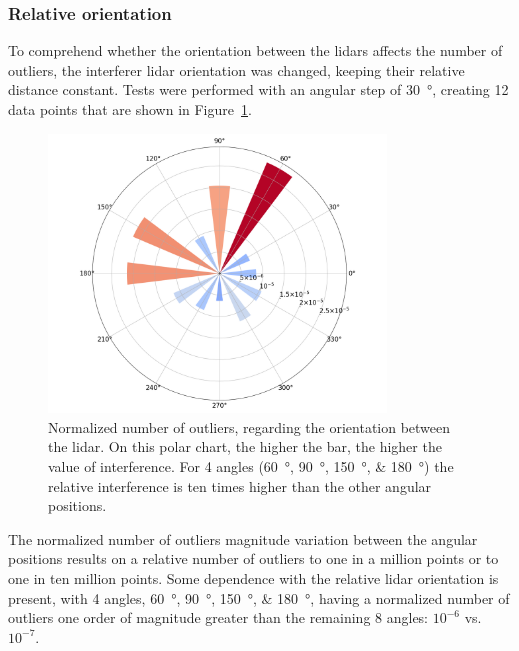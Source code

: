 \subsubsection{Relative orientation}
To comprehend whether the orientation between the \acp{lidar} affects the number of outliers, the interferer \ac{lidar} orientation was changed, keeping their relative distance constant. Tests were performed with an angular step of \SI{30}{\degree}, creating 12 data points that are shown in Figure~\ref{fig:box-filter-outliers-direction}.

\begin{figure}[!ht]
\centering
\includegraphics[width=0.8\textwidth]{img/lidar-interference/box-filtering/interference-box-filter-outliers-direction.png}
\caption[Relative number of outliers when the relative orientation between the \acp{lidar} is varied on \ac{irislab}.]{Normalized number of outliers, regarding the orientation between the \ac{lidar}. On this polar chart, the higher the bar, the higher the value of interference. For 4 angles (\SIlist[list-final-separator = {, }]{60; 90; 150; 180}{\degree}) the relative interference is ten times higher than the other angular positions.}
\label{fig:box-filter-outliers-direction}
\end{figure}

The normalized number of outliers magnitude variation between the angular positions results on a relative number of outliers to one in a million points or to one in ten million points. Some dependence with the relative \ac{lidar} orientation is present, with 4 angles, \SIlist[list-final-separator = {, }]{60; 90; 150; 180}{\degree}, having a normalized number of outliers one order of magnitude greater than the remaining 8 angles: $10^{-6}$ vs. $10^{-7}$.

